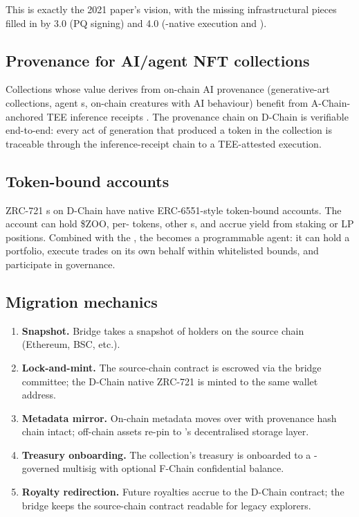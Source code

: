 This is exactly the 2021 paper's vision, with the missing
infrastructural pieces filled in by \Zoo{} 3.0 (PQ signing) and
\Zoo{} 4.0 (\GPU{}-native execution and \DEX{}).

\subsection{Provenance for AI/agent NFT collections}

Collections whose value derives from on-chain AI provenance
(generative-art collections, agent \NFT{}s, on-chain creatures with
AI behaviour) benefit from A-Chain-anchored TEE inference receipts
\cite{lp-134}. The provenance chain on \Zoo{} D-Chain is verifiable
end-to-end: every act of generation that produced a token in the
collection is traceable through the inference-receipt chain to a
TEE-attested execution.

\subsection{Token-bound accounts}

ZRC-721 \NFT{}s on \Zoo{} D-Chain have native ERC-6551-style
token-bound accounts. The account can hold \$ZOO, per-\LLM{} tokens,
other \NFT{}s, and accrue yield from staking or LP positions.
Combined with the \Zoo{} \DEX{}, the \NFT{} becomes a programmable
agent: it can hold a portfolio, execute trades on its own behalf
within whitelisted bounds, and participate in governance.

\subsection{Migration mechanics}

\begin{enumerate}[leftmargin=1.4em]
  \item \textbf{Snapshot.} \Zoo{} Bridge takes a snapshot of holders
        on the source chain (Ethereum, BSC, etc.).
  \item \textbf{Lock-and-mint.} The source-chain contract is escrowed
        via the bridge committee; the \Zoo{} D-Chain native ZRC-721
        is minted to the same wallet address.
  \item \textbf{Metadata mirror.} On-chain metadata moves over with
        provenance hash chain intact; off-chain assets re-pin to
        \Zoo{}'s decentralised storage layer.
  \item \textbf{Treasury onboarding.} The collection's treasury is
        onboarded to a \Zoo{} \DAO{}-governed multisig with optional
        F-Chain confidential balance.
  \item \textbf{Royalty redirection.} Future royalties accrue to the
        D-Chain contract; the bridge keeps the source-chain contract
        readable for legacy explorers.
\end{enumerate}

